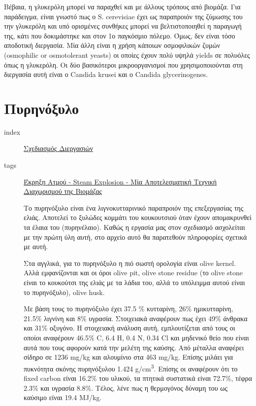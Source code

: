 \documentclass[11pt]{article}
\begin{document}
Βέβαια, η γλυκερόλη μπορεί να παραχθεί και με άλλους τρόπους από βιομάζα. Για παράδειγμα, είναι γνωστό πως ο S. cerevisiae έχει ως παραπροιόν της ζύμωσης του την γλυκερόλη και υπό ορισμένες συνθήκες μπορεί να βελτιστοποιηθεί η παραγωγή της, κάτι που δοκιμάστηκε και στον 1ο παγκόσμιο πόλεμο. Όμως, δεν είναι τόσο αποδοτική διεργασία. Μία άλλη είναι η χρήση κάποιων οσμοφιλικών ζυμών (osmophilic or osmotolerant yeasts) οι οποίες έχουν πολύ υψηλά yields σε πολυόλες όπως η γλυκερόλη. Οι δύο βασικότεροι μικροοργανισμοί που χρησιμοποιούνται στη διεργασία αυτή είναι ο Candida krusei και ο Candida glycerinogenes.
\section{Πυρηνόξυλο}
\label{sec:orga5da889}
\begin{description}
\item[{index}] \href{\detokenize{../../../../org_roam/σχεδιασμος_διεργασιων-05-10-22.org}}{Σχεδιασμός Διεργασιών}
\item[{tags}] \href{\detokenize{../../../../org_roam/εκρηξη_ατμου_steam_explosion_μια_αποτελεσματικη_τεχνικη_διαχωρισμου_της_βιομαζας-08-11-22.org}}{Έκρηξη Ατμού - Steam Explosion - Μία Αποτελεσματική Τεχνική Διαχωρισμού της Βιομάζας} 

Το πυρηνόξυλο είναι ένα λιγνοκυτταρινικό παραπροιόν της επεξεργασίας της ελιάς. Αποτελεί το ξυλώδες κομμάτι του κουκουτσιού όταν έχουν απομακρυνθεί τα έλαια του (πυρηνέλαιο). Καθώς η εργασία μας στον σχεδιασμό ασχολείται με την πρώτη ύλη αυτή, στο αρχείο αυτό θα παρατεθούν πληροφορίες σχετικά με αυτή.

Στα αγγλικά, για το πυρηνόξυλο η πιό σωστή ορολογία είναι olive kernel. Αλλά εμφανίζονται και οι όροι olive pit, olive stone residue (το olive stone είναι το κουκούτσι της ελιάς με τα λάδια του, αλλά το υπόλειμμα αυτού είναι το πυρηνόξυλο), olive husk.

Με βάση τους \cite{koutsomitopoulouPreparationCharacterizationOlive2014} το πυρηνόξυλο έχει 37.5 \% κυτταρίνη, 26\% ημικυτταρίνη, 21.5\% λιγνίνη και 8\% υγρασία. Στοιχειακά αναφέρουν πως έχει 49\% άνθρακα και 31\% οξυγόνο. Η στοιχειακή ανάλυση αυτή, εμπλουτίζεται από τους \cite{gonzalezCombustionOptimisationBiomass2004a} οι οποίοι αναφέρουν 46.5\% C, 6.4 Η, 0.4 Ν, 0.34 Cl και μηδενικό θείο που είναι αυτά που τους αφορούν κατά την μελέτη της καύσης. Από μέταλλα αναφέρει σίδηρο σε 1236 mg/kg και αλουμίνιο στα 463 mg/kg. Επίσης μιλάει για πυκνότητα σκόνης πυρηνόξυλου 1.424 g/cm\textsuperscript{3}. Επίσης οι \cite{gonzalezCombustionOptimisationBiomass2004a} αναφέρουν ότι το fixed carbon είναι 16.2\% του υλικού, τα πτητικά συστατικά είναι 72.7\%, τέφρα 2.3\% και υγρασία 8.8\%. Τέλος, λένε πως η θερμογόνος δύναμη του ως καύσιμο είναι 19.4 MJ/kg.


\end{description}
\end{document}
